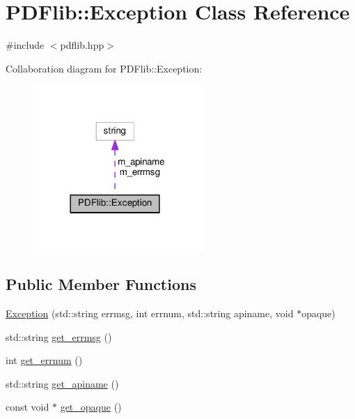 \hypertarget{classPDFlib_1_1Exception}{\section{P\+D\+Flib\+:\+:Exception Class Reference}
\label{classPDFlib_1_1Exception}
}


{\ttfamily \#include $<$pdflib.\+hpp$>$}



Collaboration diagram for P\+D\+Flib\+:\+:Exception\+:\nopagebreak
\begin{figure}[H]
\begin{center}
\leavevmode
\includegraphics[width=182pt]{classPDFlib_1_1Exception__coll__graph}
\end{center}
\end{figure}
\subsection*{Public Member Functions}
\begin{DoxyCompactItemize}
\item 
\hyperlink{classPDFlib_1_1Exception_a57fa9533e1498e00612ac13349c78ac8}{Exception} (std\+::string errmsg, int errnum, std\+::string apiname, void $\ast$opaque)
\item 
std\+::string \hyperlink{classPDFlib_1_1Exception_a0a197e182bf824c5654f721bf18debbf}{get\+\_\+errmsg} ()
\item 
int \hyperlink{classPDFlib_1_1Exception_aa29ae977a69d26d5a6aea1da399ff599}{get\+\_\+errnum} ()
\item 
std\+::string \hyperlink{classPDFlib_1_1Exception_a1463d47b0cb8d9f2251ffcbede9f6310}{get\+\_\+apiname} ()
\item 
const void $\ast$ \hyperlink{classPDFlib_1_1Exception_a6a286472fd0e02d9a02d24c2d83478f1}{get\+\_\+opaque} ()
\end{DoxyCompactItemize}
